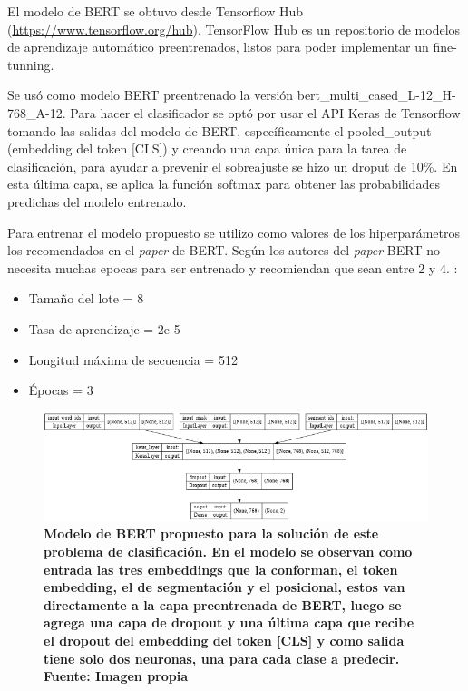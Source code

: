 El modelo de BERT se obtuvo desde Tensorflow Hub (\url{https://www.tensorflow.org/hub}). TensorFlow Hub es un repositorio de modelos de aprendizaje automático preentrenados, listos para poder implementar un fine-tunning.

Se usó como modelo BERT preentrenado la versión bert\_multi\_cased\_L-12\_H-768\_A-12. Para hacer el clasificador se optó por usar el API Keras de Tensorflow tomando las salidas del modelo de BERT, específicamente el pooled\_output (embedding del token [CLS]) y creando una capa única para la tarea de clasificación, para ayudar a prevenir el sobreajuste se hizo un droput de 10\%. En esta última capa, se aplica la función softmax para obtener las probabilidades predichas del modelo entrenado.

Para entrenar el modelo propuesto se utilizo como valores de los hiperparámetros los recomendados en el \textit{paper} de BERT. Según los autores del \textit{paper} BERT no necesita muchas epocas para ser entrenado y recomiendan que sean entre 2 y 4. \cite{https://doi.org/10.48550/arxiv.1810.04805}:

\begin{itemize}
    \item Tamaño del lote = 8
    \item Tasa de aprendizaje = 2e-5
    \item Longitud máxima de secuencia = 512
    \item Épocas = 3
\end{itemize}

\begin{figure}[ht!]
    \centering
    \includegraphics[scale=0.6]{figuras/as-modelo.png}
    \caption[Análisis de Sentimiento - Modelo de la solución]{\textbf{Modelo de BERT propuesto para la solución de este problema de clasificación. En el modelo se observan como entrada las tres embeddings que la conforman, el token embedding, el de segmentación y el posicional, estos van directamente a la capa preentrenada de BERT, luego se agrega una capa de dropout y una última capa que recibe el dropout del embedding del token [CLS] y como salida tiene solo dos neuronas, una para cada clase a predecir. Fuente: Imagen propia}}
    \label{fig-as-modelo}
\end{figure}

